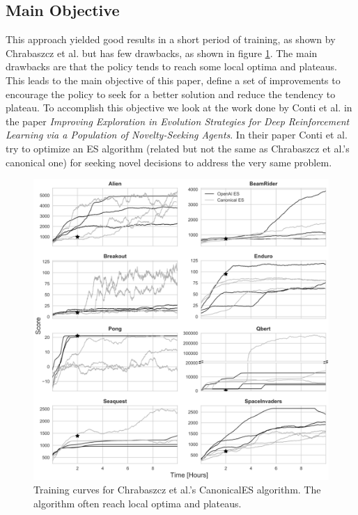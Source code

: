 \documentclass[11 pt, twocolumn]{article}
\begin{document}
\subsection{Main Objective}
This approach yielded good results in a short period of training, as shown by Chrabaszcz et al. but has few drawbacks, as shown in figure \ref{fig:canonical_results}. The main drawbacks are that the policy tends to reach some local optima and plateaus. This leads to the main objective of this paper, define a set of improvements to encourage the policy to seek for a better solution and reduce the tendency to plateau. To accomplish this objective we look at the work done by Conti et al. \cite{improveES} in the paper \emph{Improving Exploration in Evolution Strategies for Deep Reinforcement Learning via a Population of Novelty-Seeking Agents}. In their paper Conti et al. try to optimize an ES algorithm (related but not the same as Chrabaszcz et al.'s canonical one) for seeking novel decisions to address the very same problem.

\begin{figure}[h!]
  \includegraphics[width=\linewidth]{canonical_train_res.png}
  \caption{Training curves for Chrabaszcz et al.'s CanonicalES algorithm. The algorithm often reach local optima and plateaus.}
  \label{fig:canonical_results}
\end{figure}
\end{document}
